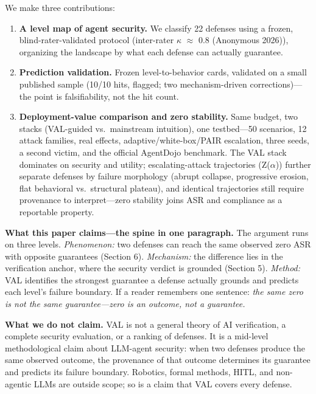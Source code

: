 \documentclass[11pt]{article}
\providecommand{\tightlist}{%

  \setlength{\itemsep}{0pt}\setlength{\parskip}{0pt}}
\begin{document}
We make three contributions:

\begin{enumerate}

\def\labelenumi{\arabic{enumi}.}

\tightlist

\item

  \textbf{A level map of agent security.} We classify 22 defenses using a frozen, blind-rater-validated protocol (inter-rater $\kappa$ $\approx$ 0.8 (Anonymous 2026)), organizing the landscape by what each defense can actually guarantee.

\item

  \textbf{Prediction validation.} Frozen level-to-behavior cards, validated on a small published sample (10/10 hits, flagged; two mechanism-driven corrections)---the point is falsifiability, not the hit count.

\item

  \textbf{Deployment-value comparison and zero stability.} Same budget, two stacks (VAL-guided vs.~mainstream intuition), one testbed---50 scenarios, 12 attack families, real effects, adaptive/white-box/PAIR escalation, three seeds, a second victim, and the official AgentDojo benchmark. The VAL stack dominates on security and utility; escalating-attack trajectories (Z($\alpha$)) further separate defenses by failure morphology (abrupt collapse, progressive erosion, flat behavioral vs.~structural plateau), and identical trajectories still require provenance to interpret---zero stability joins ASR and compliance as a reportable property.

\end{enumerate}

\textbf{What this paper claims---the spine in one paragraph.} The argument runs on three levels. \emph{Phenomenon:} two defenses can reach the same observed zero ASR with opposite guarantees (Section 6). \emph{Mechanism:} the difference lies in the verification anchor, where the security verdict is grounded (Section 5). \emph{Method:} VAL identifies the strongest guarantee a defense actually grounds and predicts each level's failure boundary. If a reader remembers one sentence: \emph{the same zero is not the same guarantee---zero is an outcome, not a guarantee.}

\textbf{What we do not claim.} VAL is not a general theory of AI verification, a complete security evaluation, or a ranking of defenses. It is a mid-level methodological claim about LLM-agent security: when two defenses produce the same observed outcome, the provenance of that outcome determines its guarantee and predicts its failure boundary. Robotics, formal methods, HITL, and non-agentic LLMs are outside scope; so is a claim that VAL covers every defense.
\end{document}
